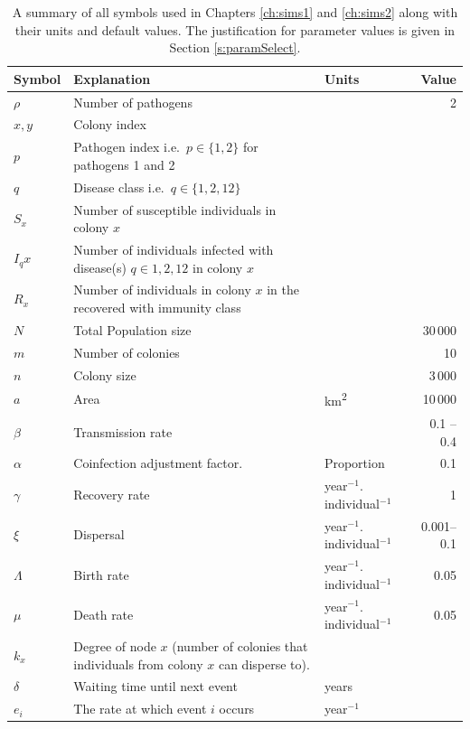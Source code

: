 \begin{table}[b!]
\centering
\caption[All symbols used in Chapters \ref{ch:sims1} and \ref{ch:sims2}.]{A summary of all symbols used in Chapters \ref{ch:sims1} and \ref{ch:sims2} along with their units and default values.
The justification for parameter values is given in Section \ref{s:paramSelect}.}

\begin{tabular}{@{}lp{6cm}p{2.9cm}r@{}}
\toprule
Symbol & Explanation & Units & Value\\
\midrule
$\rho$ & Number of pathogens && 2\\
$x, y$ & Colony index &&\\
$p$ &  Pathogen index i.e.\ $p\in\{1,2\}$ for pathogens 1 and 2 & &\\
$q$ & Disease class i.e.\ $q\in\{1,2,12\}$&\\
$S_x$ & Number of susceptible individuals in colony $x$ &&\\
$I_qx$ & Number of individuals infected with disease(s) $q \in {1, 2, 12}$ in colony $x$ &&\\
$R_x$ & Number of individuals in colony $x$ in the recovered with immunity class  &&\\
$N$ & Total Population size && 30\,000\\
$m$ & Number of colonies&& 10\\
$n$ & Colony size && 3\,000\\
$a$ & Area & \si{\square\kilo\metre}& 10\,000\\
$\beta$ & Transmission rate &  & 0.1 -- 0.4\\
$\alpha$ & Coinfection adjustment factor.  & Proportion & 0.1\\
$\gamma$ & Recovery rate & year$^{-1}.$individual$^{-1}$ & 1\\
$\xi$ & Dispersal & year$^{-1}.$individual$^{-1}$ & 0.001--0.1\\
$\Lambda$ & Birth rate & year$^{-1}.$individual$^{-1}$ & 0.05\\
$\mu$ & Death rate & year$^{-1}.$individual$^{-1}$ & 0.05\\
$k_x$ & Degree of node $x$ (number of colonies that individuals from colony $x$ can disperse to). &&\\
$\delta$ & Waiting time until next event & years &\\

$e_i$ & The rate at which event $i$ occurs & year$^{-1}$&\\
\bottomrule
\end{tabular}

\label{t:params}
\end{table}


